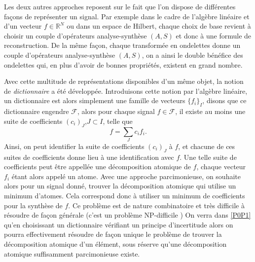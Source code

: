 Les deux autres approches reposent sur le fait que l'on dispose de différentes façons de représenter un signal.
Par exemple dans le cadre de l'algèbre linéaire et d'un vecteur $f \in \mathbb{R}^N$ ou dans un espace de Hilbert, chaque choix de base revient à choisir un couple d'opérateurs analyse-synthèse $(A, S)$ et donc à une formule de reconstruction.
De la même façon, chaque transformée en ondelettes donne un couple d'opérateurs analyse-synthèse $(A, S)$, on a ainsi le double bénéfice des ondelettes qui, en plus d'avoir de bonnes propriétés, existent en grand nombre.
\newline

Avec cette multitude de représentations disponibles d'un même objet, la notion de \emph{dictionnaire} a été développée.
Introduisons cette notion par l'algèbre linéaire, un dictionnaire est alors simplement une famille de vecteurs $\{f_i\}_I$, disons que ce dictionnaire engendre $\mathcal{F}$, alors pour chaque signal $f\in\mathcal{F}$, il existe au moins une suite de coefficients $(c_i)_J$,$J\subset I$, telle que
\begin{equation}
	f = \sum_J c_i f_i.
\end{equation}
Ainsi, on peut identifier la suite de coefficients $(c_i)_J$ à $f$, et chacune de ces suites de coefficients donne lieu à une identification avec $f$.
Une telle suite de coefficients peut être appellée une décomposition atomique de $f$, chaque vecteur $f_i$ étant alors appelé un atome.
Avec une approche parcimonieuse, on souhaite alors pour un signal donné, trouver la décomposition atomique qui utilise un minimum d'atomes. 
Cela correspond donc à utiliser un minimum de coefficients pour la synthèse de $f$.
\newline
Ce problème est de nature combinatoire et très difficile à résoudre de façon générale (c'est un problème NP-difficile \cite{NPHard})
On verra dans \ref{P0P1} qu'en choisissant un dictionnaire vérifiant un principe d'incertitude alors on pourra effectivement résoudre de façon unique le problème de trouver la décomposition atomique d'un élément, sous réserve qu'une décomposition atomique suffisamment parcimonieuse existe.  
\newline

